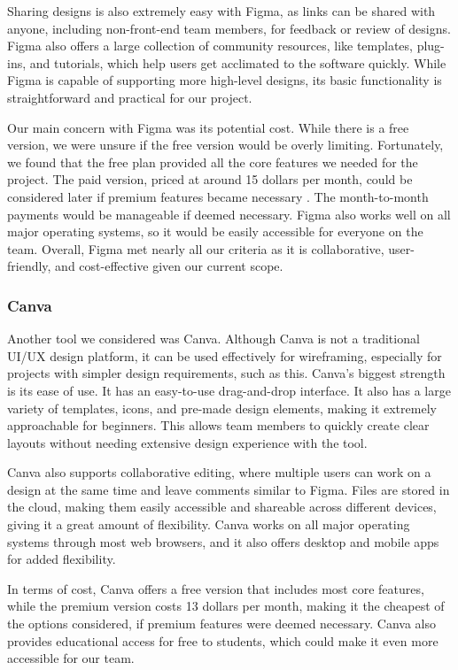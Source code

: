 \documentclass[12pt,titlepage]{article}
\begin{document}
Sharing designs is also extremely easy with Figma, as links can be shared with anyone, including non-front-end team members, for feedback or review of designs. Figma also offers a large collection of community resources, like templates, plug-ins, and tutorials, which help users get acclimated to the software quickly. While Figma is capable of supporting more high-level designs, its basic functionality is straightforward and practical for our project.

Our main concern with Figma was its potential cost. While there is a free version, we were unsure if the free version would be overly limiting. Fortunately, we found that the free plan provided all the core features we needed for the project. The paid version, priced at around 15 dollars per month, could be considered later if premium features became necessary \cite{figma-pricing}. The month-to-month payments would be manageable if deemed necessary. Figma also works well on all major operating systems, so it would be easily accessible for everyone on the team. Overall, Figma met nearly all our criteria as it is collaborative, user-friendly, and cost-effective given our current scope.

\subsubsection{Canva}
Another tool we considered was Canva. Although Canva is not a traditional UI/UX design platform, it can be used effectively for wireframing, especially for projects with simpler design requirements, such as this. Canva's biggest strength is its ease of use. It has an easy-to-use drag-and-drop interface. It also has a large variety of templates, icons, and pre-made design elements, making it extremely approachable for beginners. This allows team members to quickly create clear layouts without needing extensive design experience with the tool.

Canva also supports collaborative editing, where multiple users can work on a design at the same time and leave comments similar to Figma. Files are stored in the cloud, making them easily accessible and shareable across different devices, giving it a great amount of flexibility. Canva works on all major operating systems through most web browsers, and it also offers desktop and mobile apps for added flexibility.

In terms of cost, Canva offers a free version that includes most core features, while the premium version costs 13 dollars per month, making it the cheapest of the options considered, if premium features were deemed necessary. Canva also provides educational access for free to students, which could make it even more accessible for our team.
\end{document}
